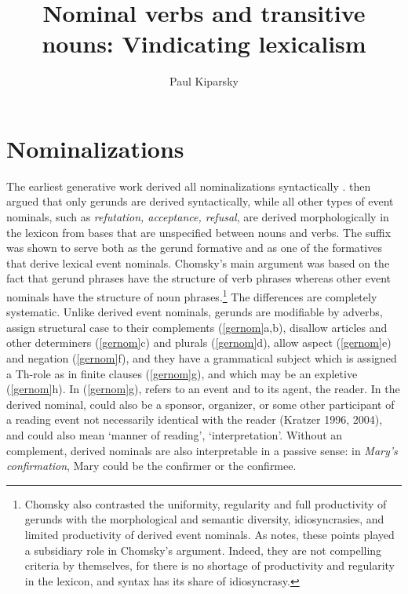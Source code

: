 \documentclass[output=paper,
modfonts
]{LSP/langsci}
\author{Paul Kiparsky\affiliation{Stanford University}}
\title{Nominal verbs and transitive nouns: Vindicating lexicalism}
\begin{document}
\maketitle


\section{Nominalizations}\label{eventnomsection}

The earliest generative work derived all nominalizations syntactically \citep{chomsky1955,lees1960}.  \citet{chomsky1970} then argued that only  gerunds are derived syntactically,
while all other types of event nominals, such as \textit{refutation, acceptance, refusal}, are
derived morphologically in the lexicon from bases that are unspecified between nouns and verbs.
The suffix  was shown to serve both as the gerund formative and as one of the
 formatives that derive lexical event nominals.  Chomsky's main argument was based on the fact
that gerund phrases have the structure of verb phrases whereas other event nominals have the
structure of noun phrases.\footnote{Chomsky also contrasted the uniformity, regularity and full
  productivity of gerunds with the morphological and semantic diversity, idiosyncrasies, and
  limited productivity of derived event nominals. As \citealt{anderson2016} notes, these points played a
  subsidiary role in Chomsky's argument.  Indeed, they are not compelling criteria by
  themselves, for there is no shortage of productivity and regularity in the lexicon, and
  syntax has its share of idiosyncrasy.} The differences are completely systematic.  Unlike
derived event nominals, gerunds are modifiable by adverbs, assign structural case to their
complements (\cref{gernom}{a,b}), disallow articles and other determiners (\cref{gernom}{c}) and
plurals (\cref{gernom}{d}), allow aspect (\cref{gernom}{e}) and negation (\cref{gernom}{f}), and they
have a grammatical subject which is assigned a Th-role as in finite clauses (\cref{gernom}{g}),
and which may be an expletive (\cref{gernom}{h}). In (\cref{gernom}{g}),  refers to an event and  to its agent, the reader. In the derived nominal,  could also be a
sponsor, organizer, or some other participant of a reading event not necessarily identical with
the reader (Kratzer 1996, 2004), and  could also mean `manner of reading',
`interpretation'.  Without an  complement, derived nominals are also interpretable
in a passive sense: in \textit{Mary's confirmation}, Mary could be the confirmer or the
confirmee.
\end{document}

